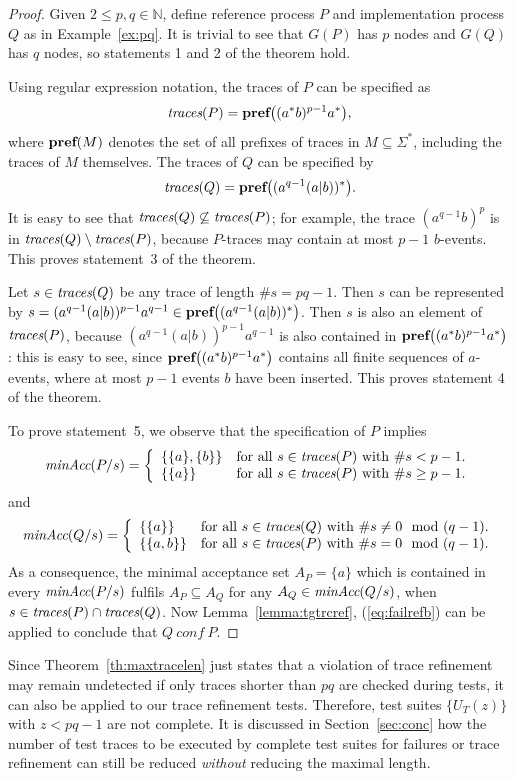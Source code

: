 \begin{proof}
Given $2\le p,q \in\mathbb{N}$, define reference process $P$ and implementation process $Q$ as in Example~\ref{ex:pq}. It is trivial to see that 
$G(P)$ has $p$ nodes and $G(Q)$ has $q$ nodes, so statements 1 and 2 of the theorem hold.

Using regular expression notation, the traces of $P$ can be specified as
\[
\text{\it traces}(P) = \text{\bf pref}\big(  (a^*b)^{p-1}a^* \big),
\]
where $\text{\bf pref}(M)$ denotes the set of all prefixes of traces in $M\subseteq\Sigma^*$,
including the traces of $M$ themselves.
The traces of $Q$ can be specified by
\[
\text{\it traces}(Q) = \text{\bf pref}\big( (a^{q-1}(a|b))^*  \big).
\]
It is easy to see that $\text{\it traces}(Q)\not\subseteq\text{\it traces}(P)$; for example, the trace
$(a^{q-1}b)^p$ is in $\text{\it traces}(Q)\setminus\text{\it traces}(P)$, because $P$-traces may contain at most $p-1$ $b$-events. This proves statement~3 of the theorem.

Let $s \in\text{\it traces}(Q)$ be any trace of length $\#s = pq-1$. Then $s$ can be represented
by $s = (a^{q-1}(a|b))^{p-1}a^{q-1} \in \text{\bf pref}\big( (a^{q-1}(a|b))^*  \big)$.
Then $s$ is also an element of $\text{\it traces}(P)$, because $(a^{q-1}(a|b))^{p-1}a^{q-1}$
is also contained in $\text{\bf pref}\big(  (a^*b)^{p-1}a^* \big)$: this is easy to see, since
$\text{\bf pref}\big(  (a^*b)^{p-1}a^* \big)$ contains all finite sequences of $a$-events,
where at most $p-1$ events $b$ have been inserted. This proves statement 4 of the theorem.

To prove statement~5, we observe that the specification of $P$ implies
\[
\text{\it minAcc}(P/s) = \left\{
\begin{array}{ll}
\{ \{a\}, \{b\} \} & \text{for all $s\in\text{\it traces}(P)$ with $\#s<p-1$.}
\\
\{ \{a\} \} & \text{for all $s\in\text{\it traces}(P)$ with $\#s\ge p-1$.}
\end{array}
\right.
\]
and
\[
\text{\it minAcc}(Q/s) = \left\{
\begin{array}{ll}
\{ \{a\}  \} & \text{for all $s\in\text{\it traces}(Q)$ with $\#s \neq 0\mod(q-1)$.}
\\
\{ \{a,b\} \} & \text{for all $s\in\text{\it traces}(P)$ with $\#s = 0\mod(q-1)$.}
\end{array}
\right.
\]
As a  consequence, the minimal acceptance set $A_P = \{a\}$ which is
contained in every $\text{\it minAcc}(P/s)$ fulfils $A_P \subseteq A_Q$ for
any $A_Q\in\text{\it minAcc}(Q/s)$, when $s\in\text{\it traces}(P)\cap \text{\it traces}(Q)$. Now Lemma~\ref{lemma:tgtrcref}, 
(\ref{eq:failrefb}) can be applied to conclude that $Q\ conf\ P$.
\xbox
\end{proof}
%
Since Theorem~\ref{th:maxtracelen} just states that a violation of trace
refinement may remain undetected if only traces shorter than $pq$ are checked
during tests, it can also be applied to our trace refinement tests.
Therefore, test suites $\{ U_T(z) \}$ with $z<pq-1$ are not complete. It is
discussed in Section~\ref{sec:conc} how the number of test traces to be
executed by complete test suites for failures or trace refinement can still
be reduced {\it without} reducing the maximal length.

